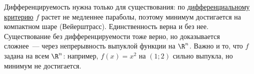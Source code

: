 

\begin{remark}
  Дифференцируемость нужна только для существования: по \hyperref[note:1B5A3E25-56E8-4D5E-9CF6-E2731DA77604]{дифференциальному критерию} $f$ растет не медленнее параболы, поэтому минимум достигается на компактном шаре (Вейерштрасс). Единственность верна и без нее. Существование без дифференцируемости тоже верно, но доказывается сложнее~--- через непрерывность выпуклой функции на $\R^n$.
  Важно и то, что $f$ задана на всем $\R^n$: например, $f(x) = x^2$ на $(1;2)$ сильно выпукла, но минимум не достигается.
\end{remark}


